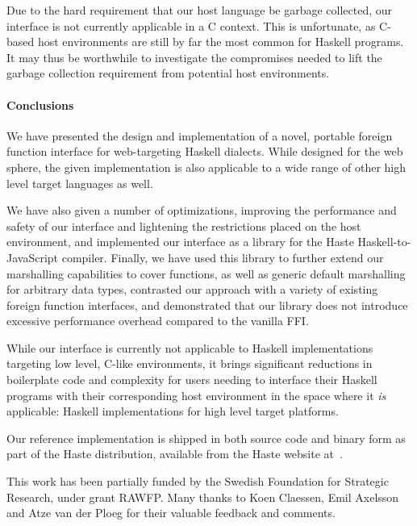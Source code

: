 \documentclass[preprint]{sigplanconf}
\begin{document}
Due to the hard requirement that our host language be garbage collected,
our interface is not currently applicable in a C context. This is unfortunate,
as C-based host environments are still by far the most common for Haskell
programs. It may thus be worthwhile to investigate the compromises needed
to lift the garbage collection requirement from potential host environments.

\paragraph{Conclusions}
We have presented the design and implementation of a novel, portable foreign
function interface for web-targeting Haskell dialects. While designed for the
web sphere, the given implementation is also applicable to a wide range of
other high level target languages as well.

We have also given a number of optimizations, improving the performance and
safety of our interface
and lightening the restrictions placed on the host environment, and implemented
our interface as a library for the Haste Haskell-to-JavaScript compiler.
Finally, we have used this library to further extend our marshalling
capabilities to cover functions, as well as generic default marshalling for
arbitrary data types, contrasted our approach with a variety of existing
foreign function interfaces, and demonstrated that our library does not
introduce excessive performance overhead compared to the vanilla FFI.

While our interface is currently not applicable to Haskell implementations
targeting low level, C-like environments, it brings significant reductions in
boilerplate code and complexity for users needing to interface their Haskell
programs with their corresponding host environment in the space where it
\emph{is} applicable: Haskell implementations for high level target platforms.

Our reference implementation is shipped in both source code and binary form as
part of the Haste distribution, available from the Haste website
at\ \cite{haste-lang.org}.

\acks
This work has been partially funded by the Swedish Foundation for Strategic Research, under grant RAWFP. Many thanks to Koen Claessen, Emil Axelsson and Atze van der Ploeg for their valuable feedback and comments.



\end{document}
